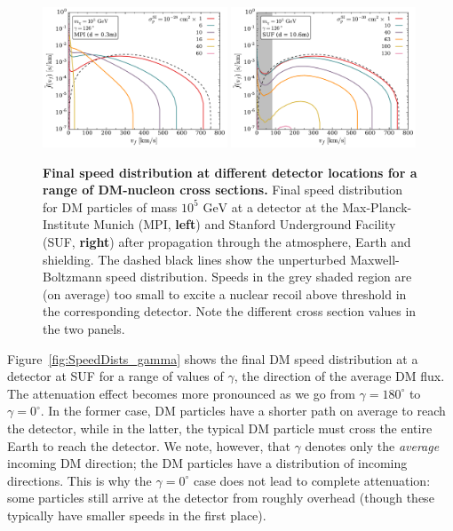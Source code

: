 \documentclass[prd,twocolumn,showpacs,nofootinbib,aps]{revtex4-1}
\begin{document}
\begin{figure}[t]
\centering
\includegraphics[width=0.49\textwidth,]{plots/SpeedDists_xsec_nucleus.pdf}
\includegraphics[width=0.49\textwidth,]{plots/SpeedDists_xsec_CDMS.pdf}
\caption{\textbf{Final speed distribution at different detector locations for a range of DM-nucleon cross sections.} Final speed distribution for DM particles of mass $10^5 \,\,\mathrm{GeV}$ at a detector at the Max-Planck-Institute Munich (MPI, \textbf{left}) and Stanford Underground Facility (SUF, \textbf{right}) after propagation through the atmosphere, Earth and shielding. The dashed black lines show the unperturbed Maxwell-Boltzmann speed distribution. Speeds in the grey shaded region are (on average) too small to excite a nuclear recoil above threshold in the corresponding detector. Note the different cross section values in the two panels.}
\label{fig:SpeedDists_xsec}
\end{figure}


Figure~\ref{fig:SpeedDists_gamma} shows the final DM speed distribution at a detector at SUF for a range of values of $\gamma$, the direction of the average DM flux. The attenuation effect becomes more pronounced as we go from $\gamma = 180^\circ$ to $\gamma = 0^\circ$. In the former case, DM particles have a shorter path  on average to reach the detector, while in the latter, the typical DM particle must cross the entire Earth to reach the detector. We note, however, that $\gamma$ denotes only the \textit{average} incoming DM direction; the DM particles have a distribution of incoming directions. This is why the $\gamma = 0^\circ$ case does not lead to complete attenuation: some particles still arrive at the detector from roughly overhead (though these typically have smaller speeds in the first place). 
\end{document}
